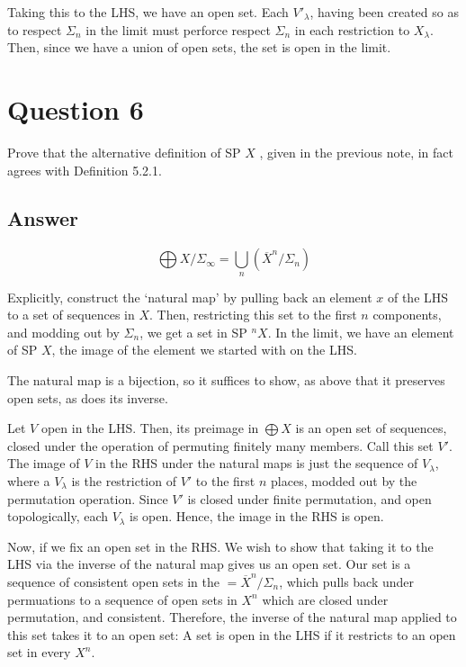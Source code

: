 \documentclass[11pt]{article}
\begin{document}
Taking this to the LHS, we have an open set. Each $V'_\lambda$, having been created so as to respect $\Sigma_n$ in the limit must perforce respect $\Sigma_n$ in each restriction to $X_\lambda$. Then, since we have a union of open sets, the set is open in the limit.






\section{Question 6}
Prove that the alternative definition of SP $X$ , given in the previous note, in fact agrees with Definition 5.2.1. 
\subsection{Answer}




\[\bigoplus X / \Sigma_\infty = \bigcup_n (\overline{X}^n / \Sigma_n) \]


Explicitly, construct the `natural map' by pulling back an element $x$ of the LHS to a set of sequences in $X$. Then, restricting this set to the first $n$ components, and modding out by $\Sigma_n$, we get a set  in SP $^n X$.  In the limit, we have an element of SP $X$, the image of the element we started with on the LHS.


The natural map is a bijection, so it suffices to show, as above that it preserves open sets, as does its inverse.

Let $V$ open in the LHS. Then, its preimage in $\bigoplus X$ is an open set of sequences, closed under the operation of permuting finitely many members. Call this set $V'$. The image of $V$ in the RHS under the natural maps is just the sequence of $V_\lambda$, where a $V_ \lambda$ is the restriction of $V'$ to the first $n$ places,  modded out by the permutation operation. Since $V'$ is closed under finite permutation, and open topologically, each $V_\lambda$ is open. Hence, the image in the RHS is open.

Now, if we fix an open set in the RHS. We wish to show that taking it to the LHS via the inverse of the natural map gives us an open set. Our set is a sequence of consistent open sets in the $=\overline{X}^n / \Sigma_n$, which pulls back under permuations to a sequence of open sets in $X^n$ which are closed under permutation, and consistent. Therefore, the inverse  of the natural map applied to this set takes it to an open set: A set is open in the LHS if it restricts to an open set in every $X^n$. 
\end{document}
